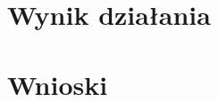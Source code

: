 \documentclass[a4paper, 11pt, oneside]{article}
\begin{document}
\section{Wynik działania}
\section{Wnioski}
\end{document}
